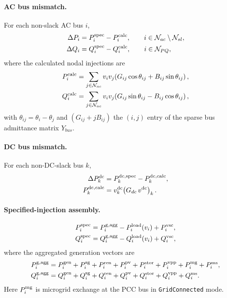 \paragraph{AC bus mismatch.}
For each non-slack AC bus \(i\),
\begin{align}
\Delta P_i &= P_i^{\mathrm{spec}} - P_i^{\mathrm{calc}},
\qquad i\in\mathcal{N}_{ac}\setminus\mathcal{N}_{sl}, \\
\Delta Q_i &= Q_i^{\mathrm{spec}} - Q_i^{\mathrm{calc}},
\qquad i\in\mathcal{N}_{PQ},
\end{align}
where the calculated nodal injections are
\begin{align}
P_i^{\mathrm{calc}} &= \sum_{j\in\mathcal{N}_{ac}}
v_i v_j\!\left(G_{ij}\cos\theta_{ij}+B_{ij}\sin\theta_{ij}\right), \\
Q_i^{\mathrm{calc}} &= \sum_{j\in\mathcal{N}_{ac}}
v_i v_j\!\left(G_{ij}\sin\theta_{ij}-B_{ij}\cos\theta_{ij}\right),
\end{align}
with \(\theta_{ij}=\theta_i-\theta_j\) and \((G_{ij}+jB_{ij})\) the
\((i,j)\) entry of the sparse bus admittance matrix \(Y_{bus}\).

\paragraph{DC bus mismatch.}
For each non-DC-slack bus \(k\),
\begin{align}
\Delta P_k^{\mathrm{dc}} &= P_k^{\mathrm{dc,spec}} - P_k^{\mathrm{dc,calc}}, \\
P_k^{\mathrm{dc,calc}} &= v_k^{\mathrm{dc}}\!\left(G_{dc}\,v^{\mathrm{dc}}\right)_k.
\end{align}

\paragraph{Specified-injection assembly.}
\begin{align}
P_i^{\mathrm{spec}} &= P_i^{\mathrm{g,agg}} - P_i^{\mathrm{load}}(v_i) + P_i^{\mathrm{vsc}}, \\
Q_i^{\mathrm{spec}} &= Q_i^{\mathrm{g,agg}} - Q_i^{\mathrm{load}}(v_i) + Q_i^{\mathrm{vsc}},
\end{align}
where the aggregated generation vectors are
\begin{align}
P_i^{\mathrm{g,agg}} &= P_i^{\mathrm{gen}} + P_i^{\mathrm{sg}} + P_i^{\mathrm{ren}}
+ P_i^{\mathrm{pv}} + P_i^{\mathrm{stor}} + P_i^{\mathrm{vpp}}
+ P_i^{\mathrm{mg}} + P_i^{\mathrm{ms}}, \\
Q_i^{\mathrm{g,agg}} &= Q_i^{\mathrm{gen}} + Q_i^{\mathrm{sg}} + Q_i^{\mathrm{ren}}
+ Q_i^{\mathrm{pv}} + Q_i^{\mathrm{stor}} + Q_i^{\mathrm{vpp}}
+ Q_i^{\mathrm{ms}}.
\end{align}
Here \(P_i^{\mathrm{mg}}\) is microgrid exchange at the PCC bus in
\texttt{GridConnected} mode.

